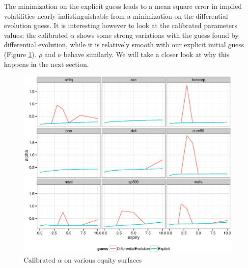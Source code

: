 \documentclass[]{rAMF2e}
\begin{document}
The minimization on the explicit guess leads to a mean square error in implied volatilities nearly indistinguishable from a minimization on the differential evolution guess. It is interesting however to look at the calibrated parameters values: the calibrated $\alpha$ shows some strong variations with the guess found by differential evolution, while it is relatively smooth with our explicit initial guess (Figure  \ref{fig:explicit_de_equity_alpha}). $\rho$ and $\nu$ behave similarly. We will take a closer look at why this happens in the next section.
\begin{figure}[!h]
  \caption{\label{fig:explicit_de_equity_alpha}Calibrated $\alpha$ on various equity surfaces}
\begin{center}
 \includegraphics[width=16cm]{explicit_de_equity_alpha.eps}
\end{center}
\end{figure}
\end{document}
